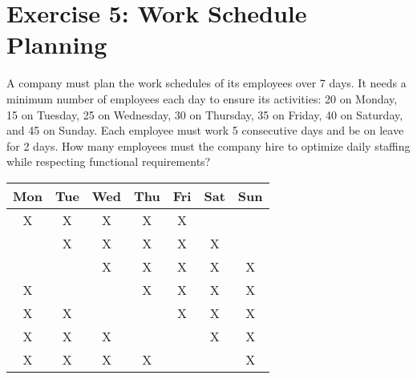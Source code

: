 
\section*{Exercise 5: Work Schedule Planning}

A company must plan the work schedules of its employees over 7 days. It needs a minimum number of employees each day to ensure
its activities: 20 on Monday, 15 on Tuesday, 25 on Wednesday, 30 on Thursday, 35 on Friday, 40 on Saturday, and 45 on Sunday. Each
employee must work 5 consecutive days and be on leave for 2 days. How many employees must the company hire to optimize daily 
staffing while respecting functional requirements?

\vspace{1cm}
\begin{center}
\begin{tabular}{|c|c|c|c|c|c|c|}
    \hline
     Mon & Tue & Wed & Thu & Fri & Sat & Sun\\
     \hline
     X & X & X & X & X & &\\
     \hline
     & X & X & X & X & X & \\
     \hline
     & & X & X & X & X & X \\
     \hline
     X & & & X & X & X & X\\
     \hline
     X & X & & & X & X & X\\
     \hline
     X & X & X & & & X & X\\
     \hline
     X & X & X & X & & & X\\
     \hline
 \end{tabular}
\end{center}

